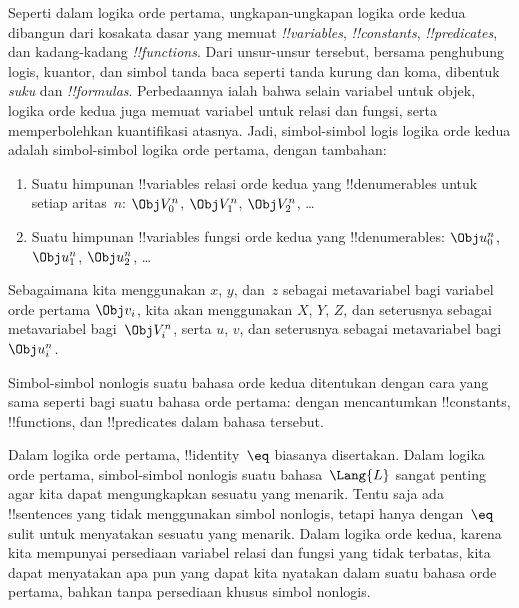 \documentclass[../../../include/open-logic-section]{subfiles}
\begin{document}


Seperti dalam logika orde pertama, ungkapan-ungkapan logika orde kedua
dibangun dari kosakata dasar yang memuat \emph{!!{variable}s},
\emph{!!{constant}s}, \emph{!!{predicate}s}, dan kadang-kadang
\emph{!!{function}s}. Dari unsur-unsur tersebut, bersama penghubung logis,
kuantor, dan simbol tanda baca seperti tanda kurung dan koma, dibentuk
\emph{suku} dan \emph{!!{formula}s}. Perbedaannya ialah bahwa selain variabel
untuk objek, logika orde kedua juga memuat variabel untuk relasi dan fungsi,
serta memperbolehkan kuantifikasi atasnya. Jadi, simbol-simbol logis logika
orde kedua adalah simbol-simbol logika orde pertama, dengan tambahan:

\begin{enumerate}
\item Suatu himpunan !!{variable}s relasi orde kedua yang !!{denumerable}s untuk
  setiap aritas~$n$: $\Obj V_0^n$, $\Obj V_1^n$, $\Obj V_2^n$, \dots
\item Suatu himpunan !!{variable}s fungsi orde kedua yang !!{denumerable}s:
  $\Obj u_0^n$, $\Obj u_1^n$, $\Obj u_2^n$, \dots
\end{enumerate}

Sebagaimana kita menggunakan $x$, $y$, dan~$z$ sebagai metavariabel bagi
variabel orde pertama $\Obj v_i$, kita akan menggunakan $X$, $Y$, $Z$, dan
seterusnya sebagai metavariabel bagi~$\Obj V_i^n$, serta $u$, $v$, dan
seterusnya sebagai metavariabel bagi~$\Obj u_i^n$.

\begin{explain}
Simbol-simbol nonlogis suatu bahasa orde kedua ditentukan dengan cara yang
sama seperti bagi suatu bahasa orde pertama: dengan mencantumkan
!!{constant}s, !!{function}s, dan !!{predicate}s dalam bahasa tersebut.

Dalam logika orde pertama, !!{identity}~$\eq$ biasanya disertakan. Dalam
logika orde pertama, simbol-simbol nonlogis suatu bahasa~$\Lang{L}$ sangat
penting agar kita dapat mengungkapkan sesuatu yang menarik. Tentu saja ada
!!{sentence}s yang tidak menggunakan simbol nonlogis, tetapi hanya
dengan~$\eq$ sulit untuk menyatakan sesuatu yang menarik. Dalam logika orde
kedua, karena kita mempunyai persediaan variabel relasi dan fungsi yang tidak
terbatas, kita dapat menyatakan apa pun yang dapat kita nyatakan dalam suatu
bahasa orde pertama, bahkan tanpa persediaan khusus simbol nonlogis.
\end{explain}
\end{document}
